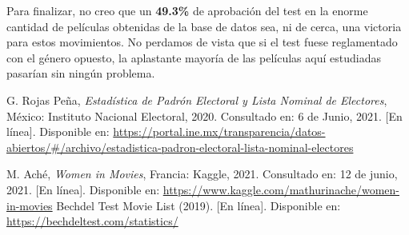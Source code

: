 \documentclass{article}
\begin{document}
Para finalizar, no creo que un \textbf{49.3\%} de aprobación del test en la enorme cantidad de películas obtenidas de la base de datos sea, ni de cerca, una victoria para estos movimientos. No perdamos de vista que si el test fuese reglamentado con el género opuesto, la aplastante mayoría de las películas aquí estudiadas pasarían sin ningún problema.


\begin{thebibliography}{}

 G. Rojas Peña, \textit{Estadística de Padrón Electoral y Lista Nominal de Electores}, México: Instituto Nacional Electoral, 2020. Consultado en: 6 de Junio, 2021. [En línea]. Disponible en: \url{https://portal.ine.mx/transparencia/datos-abiertos/#/archivo/estadistica-padron-electoral-lista-nominal-electores} 

 M. Aché, \textit{Women in Movies}, Francia: Kaggle, 2021. Consultado en: 12 de junio, 2021. [En línea]. Disponible en: \url{https://www.kaggle.com/mathurinache/women-in-movies} 
 Bechdel Test Movie List (2019). [En línea]. Disponible en: \url{https://bechdeltest.com/statistics/} 

\end{thebibliography}
\end{document}
